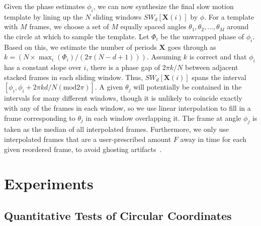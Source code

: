 \documentclass{article}
\newcommand{\mb}{\mathbf}
\begin{document}
Given the phase estimates $\phi_i$, we can now synthesize the final slow motion template by lining up the $N$ sliding windows $SW_{d}[\mb{X}(i)]$ by $\phi$.  For a template with $M$ frames, we choose a set of $M$ equally spaced angles $\theta_1, \theta_2, ..., \theta_M$ around the circle at which to sample the template.  Let $\Phi_i$ be the unwrapped phase of $\phi_i$.  Based on this, we estimate the number of periods $\mb{X}$ goes through as $k = (N \times \max_i(\Phi_i) / (2 \pi (N-d+1)))$.  Assuming $k$ is correct and that $\phi_i$ has a constant slope over $i$, there is a phase gap of $2 \pi k/N$ between adjacent stacked frames in each sliding window.  Thus, $SW_{d}[\mb{X}(i)]$ spans the interval $[\phi_i, \phi_i + 2\pi k d/N (\text{mod} 2 \pi)]$.  A given $\theta_j$ will potentially be contained in the intervals for many different windows, though it is unlikely to coincide exactly with any of the frames in each window, so we use linear interpolation to fill in a frame corresponding to $\theta_j$ in each window overlapping it.  The frame at angle $\phi_j$ is taken as the median of all interpolated frames.
Furthermore, we only use interpolated frames that are a user-prescribed amount $F$ away in time for each given reordered frame, to avoid ghosting artifacts~\cite{meyer2015phase}.

\section{Experiments}
\label{sec:experiments}


\subsection{Quantitative Tests of Circular Coordinates}
\end{document}
